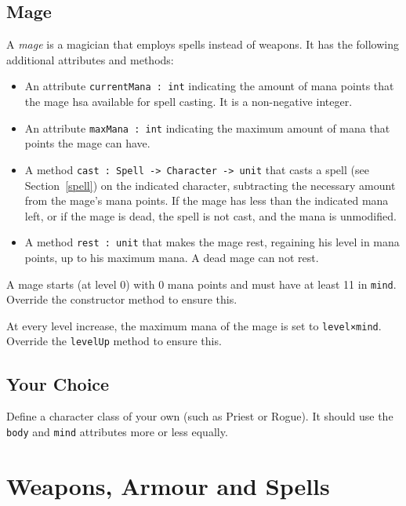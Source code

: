 \documentclass[a4paper]{article}
\begin{document}
\subsection{Mage}

A \emph{mage} is a magician that employs spells instead of weapons.
It has the following additional attributes and methods:

\begin{itemize}
\item An attribute \texttt{currentMana : int} indicating the amount of
  mana points that the mage hsa available for spell casting.  It is a
  non-negative integer.

\item An attribute \texttt{maxMana : int} indicating the maximum
  amount of mana that points the mage can have.

\item A method \texttt{cast : Spell -> Character -> unit} that casts a
  spell (see Section~\ref{spell}) on the indicated character,
  subtracting the necessary amount from the mage's mana points.  If
  the mage has less than the indicated mana left, or if the mage is
  dead, the spell is not cast, and the mana is unmodified.

\item A method \texttt{rest : unit} that makes the mage rest,
  regaining his level in mana points, up to his maximum mana.  A dead
  mage can not rest.

\end{itemize}

\noindent
A mage starts (at level 0) with 0 mana points and must have at least
11 in \texttt{mind}.  Override the constructor method to ensure this.

At every level increase, the maximum mana of the mage is set to
\texttt{level×mind}.  Override the \texttt{levelUp} method to ensure
this.

\subsection{Your Choice}

Define a character class of your own (such as Priest or Rogue).  It
should use the \texttt{body} and \texttt{mind} attributes more or less
equally.

\section{Weapons, Armour and Spells}
\end{document}
